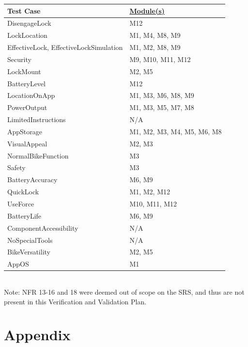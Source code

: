 \documentclass[12pt, titlepage]{article}
\begin{document}
\begin{minipage}{\textwidth}
\footnotesize
{}
\renewcommand*{\arraystretch}{1.5}
\begin{tabular}{| p{} | p{} |}
 \hline
 Test Case & \href{https://github.com/NevoAbigail/Capstone/blob/main/docs/Design/SoftArchitecture/MG.pdf}{Module(s)}  \\ 
 \hline
 DisengageLock & M12 \\ 
  \hline
 LockLocation & M1, M4, M8, M9 \\ 
  \hline
 EffectiveLock, EffectiveLockSimulation & M1, M2, M8, M9  \\ 
  \hline
 Security & M9, M10, M11, M12 \\ 
  \hline
 LockMount & M2, M5 \\ 
  \hline
 BatteryLevel & M12 \\ 
  \hline
 LocationOnApp & M1, M3, M6, M8, M9 \\ 
  \hline
 PowerOutput & M1, M3, M5, M7, M8 \\ 
  \hline
 LimitedInstructions & N/A \\
 \hline
  AppStorage & M1, M2, M3, M4, M5, M6, M8 \\
 \hline
  VisualAppeal & M2, M3 \\
 \hline
  NormalBikeFunction & M3 \\
 \hline
  Safety & M3 \\
 \hline
  BatteryAccuracy & M6, M9 \\
 \hline
  QuickLock & M1, M2, M12 \\
 \hline
 UseForce & M10, M11, M12 \\
 \hline
 BatteryLife & M6, M9 \\
 \hline
  ComponentAccessibility & N/A \\
 \hline
  NoSpecialTools & N/A \\
 \hline
  BikeVersatility & M2, M5 \\
 \hline
  AppOS & M1 \\
 \hline
 \end{tabular}
\end{minipage}\\

Note: NFR 13-16 and 18 were deemed out of scope on the SRS, and thus are not present in this Verification and Validation Plan. 





\newpage{}
\section{Appendix}
\end{document}
